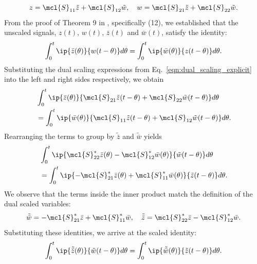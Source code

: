     \begin{equation}\label{eqn:dual_scaling_explicit}
        {z} = \mcl{S}_{11}\tilde{z} + \mcl{S}_{12}\tilde{w},\quad w = \mcl{S}_{21}\tilde{z} + \mcl{S}_{22}\tilde{w}.     
    \end{equation}
    From the proof of Theorem 9 in \cite{shivaknew}, specifically (12), we established that the unscaled signals, $z(t)$, $w(t)$, $\bar{z}(t)$ and $\bar{w}(t)$, satisfy the identity:
    \begin{equation}\label{eq:identity}
        \int_0^t\ip{\bar{z}(\theta)}{w(t-\theta)}d\theta = \int_0^t\ip{\bar{w}(\theta)}{z(t-\theta)}d\theta.
    \end{equation}
    Substituting the dual scaling expressions from Eq.~\eqref{eqn:dual_scaling_explicit} into the left and right sides respectively, we obtain
    \begin{equation*}
        \begin{aligned}
            &\int_0^t\ip{\bar{z}(\theta)}{\mcl{S}_{21}\tilde{z}(t-\theta) + \mcl{S}_{22}\tilde{w}(t-\theta)}d\theta \\
            &= \int_0^t\ip{\bar{w}(\theta)}{\mcl{S}_{11}\tilde{z}(t-\theta) + \mcl{S}_{12}\tilde{w}(t-\theta)}d\theta.
        \end{aligned}
    \end{equation*}
    Rearranging the terms to group by $\tilde{\bar{z}}$ and $\tilde{\bar{w}}$ yields
    \begin{equation*}
        \begin{aligned}
            &\int_0^t \ip{\mcl{S}^*_{22}\bar{z}(\theta) - \mcl{S}^*_{12}\bar{w}(\theta)}{\tilde{w}(t-\theta)} d\theta \\
            &= \int_0^t \ip{-\mcl{S}^*_{21}\bar{z}(\theta) + \mcl{S}^*_{11}\bar{w}(\theta)}{\tilde{z}(t-\theta)} d\theta.
        \end{aligned}
    \end{equation*}
    We observe that the terms inside the inner product match the definition of the dual scaled variables:
    \begin{equation*}
        \tilde{\bar{w}} = -\mcl{S}_{21}^*\bar{z} + \mcl{S}_{11}^*\bar{w}, \quad \tilde{\bar{z}} = \mcl{S}_{22}^*\bar{z} - \mcl{S}^*_{12}\bar{w}.
    \end{equation*}
    Substituting these identities, we arrive at the scaled identity:
    \begin{equation}\label{eqn:scaled_equivalence}
        \int_0^t\ip{\tilde{\bar{z}}(\theta)}{\tilde{w}(t-\theta)} d\theta = \int_0^t\ip{\tilde{\bar{w}}(\theta)}{\tilde{z}(t-\theta)} d\theta.
    \end{equation}
